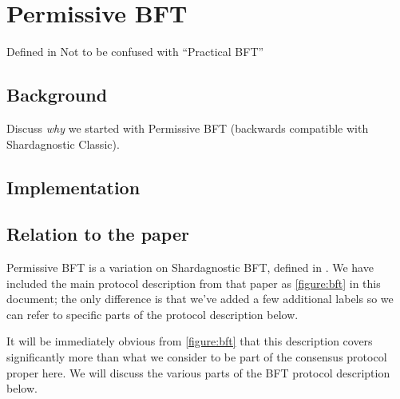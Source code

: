 \section{Permissive BFT}
\label{bft}

Defined in \cite{cole-chain-spec}
Not to be confused with ``Practical BFT'' \cite{10.1145/571637.571640}

\subsection{Background}
\label{bft:background}

\duncan
Discuss \emph{why} we started with Permissive BFT (backwards compatible with
Shardagnostic Classic).

\subsection{Implementation}

\subsection{Relation to the paper}
\label{bft-paper}

Permissive BFT is a variation on Shardagnostic BFT, defined in
\cite{cryptoeprint:2018:1049}. We have included the main protocol description
from that paper as \cref{figure:bft} in this document; the only difference is
that we've added a few additional labels so we can refer to specific parts of
the protocol description below.

It will be immediately obvious from \cref{figure:bft} that this description
covers significantly more than what we consider to be part of the consensus
protocol proper here. We will discuss the various parts of the BFT protocol
description below.

